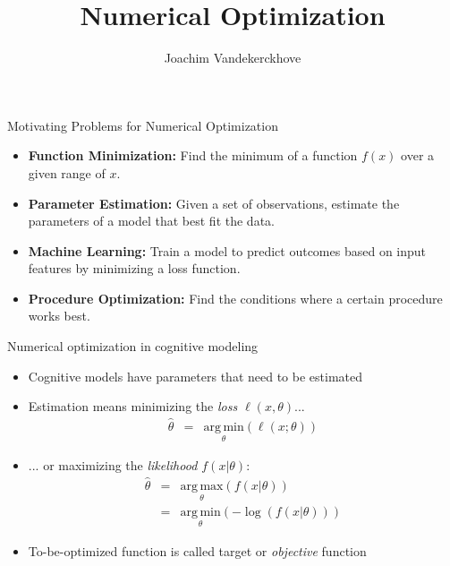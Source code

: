 \documentclass{beamer}
\title{Numerical Optimization}
\author{Joachim Vandekerckhove}
\date{}
\begin{document}
\begin{frame}
  \maketitle
\end{frame}


\begin{frame}{Motivating Problems for Numerical Optimization}

    \begin{itemize}
      \item \textbf{Function Minimization:} Find the minimum of a function $f(x)$ over a given range of $x$.
      \item \textbf{Parameter Estimation:} Given a set of observations, estimate the parameters of a model that best fit the data.
      \item \textbf{Machine Learning:} Train a model to predict outcomes based on input features by minimizing a loss function.
      \item \textbf{Procedure Optimization:} Find the conditions where a certain procedure works best.
    \end{itemize}

\end{frame}


\begin{frame}[fragile]{Numerical optimization in cognitive modeling}
  \begin{itemize}
      \item Cognitive models have parameters that need to be estimated
      \item Estimation means minimizing the \emph{loss $\ell\!\left(x , \theta\right)$}...
      \begin{eqnarray*}
          \hat\theta &=& \underset{\theta}{\mathrm{arg\,min}}
\left(\ell\!\left(x ; \theta\right)\right)
      \end{eqnarray*}
      \item ... or maximizing the \emph{likelihood $f\!\left(x | \theta\right)$}:
      \begin{eqnarray*}
          \hat\theta &=& \underset{\theta}{\mathrm{arg\,max}} \left(f\!\left(x | \theta\right)\right) \\
          &=& \underset{\theta}{\mathrm{arg\,min}} \left(-\log\left(f\!\left(x | \theta\right)\right)\right)
      \end{eqnarray*}
      \item To-be-optimized function is called target or \emph{objective} function
  \end{itemize}
\end{frame}
\end{document}
